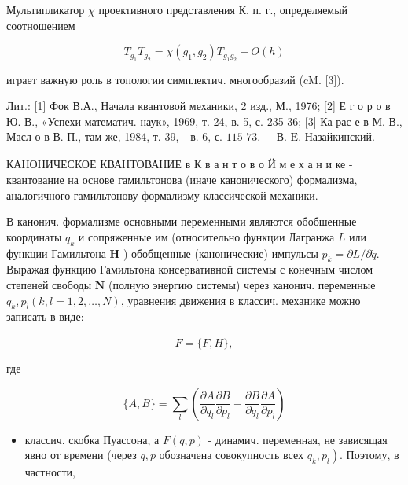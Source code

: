 \documentclass[10pt]{article}
\begin{document}
Мультипликатор $\chi$ проективного представления К. п. г., определяемый соотношением



\[

T_{g_{1}} T_{g_{2}}=\chi\left(g_{1}, g_{2}\right) T_{g_{1} g_{2}}+O(h)

\]



играет важную роль в топологии симплектич. многообразий (cM. [3]).



Лит.: [1] Фок В.А., Начала квантовой механики, 2 изд., М., 1976; [2] Е г о р о в Ю. В., «Успехи математич. наук», 1969, т. 24, в. 5, с. 235-36; [3] Ка рас е в М. В., Масл о в В. П., там же, 1984, т. 39, $\begin{array}{ll}\text { в. 6, с. 115-73. } & \text { В. E. Назайкинский. }\end{array}$



КАНОНИЧЕСКОЕ КВАНТОВАНИЕ в К в а н т о в о Й м е х а н и ке - квантование на основе гамильтонова (иначе канонического) формализма, аналогичного гамильтонову формализму классической механики.



В канонич. формализме основными переменными являются обобшенные координаты $q_{k}$ и сопряженные им (относительно функции Лагранжа $L$ или функции Гамильтона $\boldsymbol{H}$ ) обобщенные (канонические) импульсы $p_{k}=\partial L / \partial \dot{q}$. Выражая функцию Гамильтона консервативной системы с конечным числом степеней свободы $\boldsymbol{N}$ (полную энергию системы) через канонич. переменные $q_{k}, p_{l}(k, l=1,2, \ldots, N)$, уравнения движения в классич. механике можно записать в виде:



\[

\dot{F}=\{F, H\},

\]



где



\[

\{A, B\}=\sum_{l}\left(\frac{\partial A}{\partial q_{l}} \frac{\partial B}{\partial p_{l}}-\frac{\partial B}{\partial q_{l}} \frac{\partial A}{\partial p_{l}}\right)

\]



\begin{itemize}

  \item классич. скобка Пуассона, а $F(q, p)$ - динамич. переменная, не зависящая явно от времени (через $q, p$ обозначена совокупность всех $\left.q_{k}, p_{l}\right)$. Поэтому, в частности,

\end{itemize}
\end{document}
